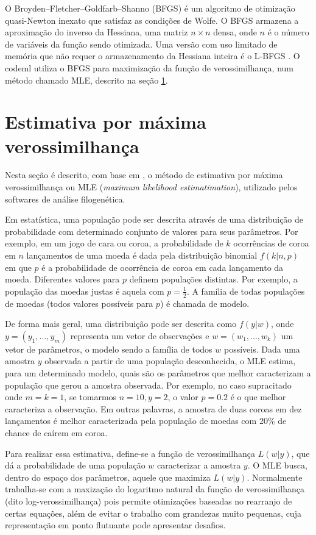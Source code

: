 \documentclass[cic,tc]{iiufrgs}
\begin{document}
O Broyden–Fletcher–Goldfarb–Shanno (BFGS) \cite{fletcher1980practical} é um
algoritmo de otimização quasi-Newton inexato que satisfaz as condições de
Wolfe. O BFGS armazena a aproximação do inverso da Hessiana, uma matriz $n
\times n$ densa, onde $n$ é o número de variáveis da função sendo otimizada.
Uma versão com uso limitado de memória que não requer o armazenamento da
Hessiana inteira é o L-BFGS \cite{liu1989limited}. O codeml utiliza o BFGS para
maximização da função de verossimilhança, num método chamado MLE, descrito na
seção \ref{sec:mle}.

\section{Estimativa por máxima verossimilhança}
\label{sec:mle}

Nesta seção é descrito, com base em \cite{myung2003tutorial}, o método de
estimativa por máxima verossimilhança ou MLE (\textit{maximum likelihood
estimatimation}), utilizado pelos softwares de análise filogenética.

Em estatística, uma população pode ser descrita através de uma distribuição de
probabilidade com determinado conjunto de valores para seus parâmetros.
Por exemplo, em um jogo de cara ou coroa, a probabilidade de $k$ ocorrências de
coroa em $n$ lançamentos de uma moeda é dada pela distribuição binomial
$f(k|n,p)$ em que $p$ é a probabilidade de ocorrência de coroa em cada
lançamento da moeda. Diferentes valores para $p$ definem populações distintas.
Por exemplo, a população das moedas justas é aquela com $p = \frac{1}{2}$. A
família de todas populações de moedas (todos valores possíveis para $p$) é
chamada de modelo.

De forma mais geral, uma distribuição pode ser descrita como $f(y|w)$, onde $y
= (y_1, ..., y_m)$ representa um vetor de observações e $w = (w_1, ..., w_k)$
um vetor de parâmetros, o modelo sendo a família de todos $w$ possíveis. Dada
uma amostra $y$ observada a partir de uma população desconhecida, o MLE estima,
para um determinado modelo, quais são os parâmetros que melhor caracterizam a
população que gerou a amostra observada. Por exemplo, no caso supracitado
onde $m = k = 1$, se tomarmos $n = 10, y = 2$, o valor $p = 0.2$ é o que melhor
caracteriza a observação. Em outras palavras, a amostra de duas coroas em dez
lançamentos é melhor caracterizada pela população de moedas com 20\% de chance
de caírem em coroa.

Para realizar essa estimativa, define-se a função de verossimilhança $L(w|y)$,
que dá a probabilidade de uma população $w$ caracterizar a amostra $y$. O MLE
busca, dentro do espaço dos parâmetros, aquele que maximiza $L(w|y)$.
Normalmente trabalha-se com a maxização do logaritmo natural da função de
verossimilhança (dito log-verossimilhança) pois permite otimizações baseadas no
rearranjo de certas equações, além de evitar o trabalho com grandezas muito
pequenas, cuja representação em ponto flutuante pode apresentar desafios. 
\end{document}
